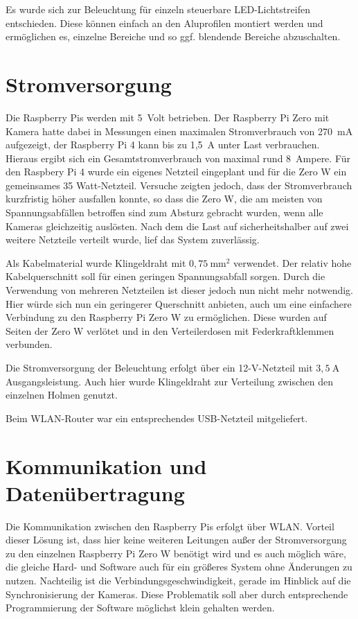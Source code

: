 \documentclass[a4paper,12pt,bibliography=totoc, listof=totoc,titlepage]{scrreprt}
\begin{document}
Es wurde sich zur Beleuchtung für einzeln steuerbare LED-Lichtstreifen entschieden. Diese können einfach an den Aluprofilen montiert werden und ermöglichen es, einzelne Bereiche und so ggf. blendende Bereiche abzuschalten.

\section{Stromversorgung}
Die Raspberry Pis werden mit 5~Volt betrieben. Der Raspberry Pi Zero mit Kamera hatte dabei in Messungen einen maximalen Stromverbrauch von 270~mA aufgezeigt, der Raspberry Pi 4 kann bis zu 1,5~A unter Last verbrauchen. Hieraus ergibt sich ein Gesamtstromverbrauch von maximal rund 8~Ampere. Für den Raspbery Pi 4 wurde ein eigenes Netzteil eingeplant und für die Zero W ein gemeinsames 35 Watt-Netzteil. Versuche zeigten jedoch, dass der Stromverbrauch kurzfristig höher ausfallen konnte, so dass die Zero W, die am meisten von Spannungsabfällen betroffen sind zum Absturz gebracht wurden, wenn alle Kameras gleichzeitig auslösten. Nach dem die Last auf sicherheitshalber auf zwei weitere Netzteile verteilt wurde, lief das System zuverlässig.

Als Kabelmaterial wurde Klingeldraht mit $0,75~\text{mm}^2$ verwendet. Der relativ hohe Kabelquerschnitt soll für einen geringen Spannungsabfall sorgen. Durch die Verwendung von mehreren Netzteilen ist dieser jedoch nun nicht mehr notwendig. Hier würde sich nun ein geringerer Querschnitt anbieten, auch um eine einfachere Verbindung zu den Raspberry Pi Zero W zu ermöglichen. Diese wurden auf Seiten der Zero W verlötet und in den Verteilerdosen mit Federkraftklemmen verbunden.

Die Stromversorgung der Beleuchtung erfolgt über ein 12-V-Netzteil mit $3,5~\text{A}$ Ausgangsleistung. Auch hier wurde Klingeldraht zur Verteilung zwischen den einzelnen Holmen genutzt.

Beim WLAN-Router war ein entsprechendes USB-Netzteil mitgeliefert.

\section{Kommunikation und Datenübertragung}
Die Kommunikation zwischen den Raspberry Pis erfolgt über WLAN. Vorteil dieser Lösung ist, dass hier keine weiteren Leitungen außer der Stromversorgung zu den einzelnen Raspberry Pi Zero W benötigt wird und es auch möglich wäre, die gleiche Hard- und Software auch für ein größeres System ohne Änderungen zu nutzen. Nachteilig ist die Verbindungsgeschwindigkeit, gerade im Hinblick auf die Synchronisierung der Kameras. Diese Problematik soll aber durch entsprechende Programmierung der Software möglichst klein gehalten werden.
\end{document}
